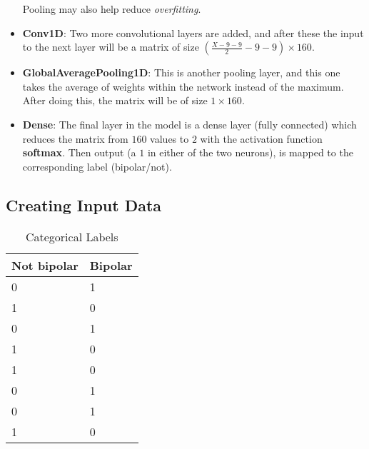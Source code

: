 \begin{itemize}
        Pooling may also help reduce \textit{overfitting}.
  \item \textbf{Conv1D}: Two more convolutional layers are added, and after these the input to the next layer will be a matrix of size
        $ (\frac{X-9-9}{2}-9-9) \times 160 $.
  \item \textbf{GlobalAveragePooling1D}: This is another pooling layer, and this one takes the average of weights within the network instead of the maximum.
        After doing this, the matrix will be of size $ 1 \times 160 $.
  \item \textbf{Dense}: The final layer in the model is a dense layer (fully connected) which reduces the matrix from $160$ values to $2$ with the
        activation function \textbf{softmax}. Then output (a $1$ in either of the two neurons), is mapped to the corresponding label (bipolar/not).
        
\end{itemize}

\subsection{Creating Input Data}
\begin{table}
  \begin{center}
    \begin{tabular}{| l | l |}
      \hline
      \textbf{Not bipolar} & \textbf{Bipolar}  \\ \hline
      0                    &  1                \\ \hline
      1                    &  0                \\ \hline
      0                    &  1                \\ \hline
      1                    &  0                \\ \hline
      1                    &  0                \\ \hline
      0                    &  1                \\ \hline
      0                    &  1                \\ \hline
      1                    &  0                \\ \hline
    \end{tabular}
    \caption{Categorical Labels}
    \label{table:categorical_labels}
  \end{center}
\end{table}

